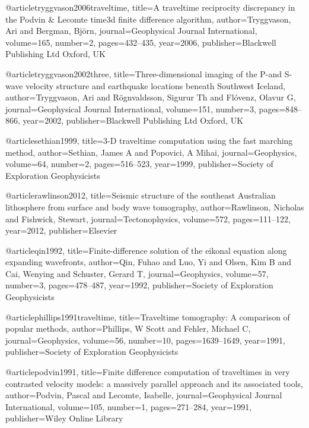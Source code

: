 @article{tryggvason2006traveltime,
  title={A traveltime reciprocity discrepancy in the Podvin \& Lecomte time3d finite difference algorithm},
  author={Tryggvason, Ari and Bergman, Bj{\"o}rn},
  journal={Geophysical Journal International},
  volume={165},
  number={2},
  pages={432--435},
  year={2006},
  publisher={Blackwell Publishing Ltd Oxford, UK}
}

@article{tryggvason2002three,
  title={Three-dimensional imaging of the P-and S-wave velocity structure and earthquake locations beneath Southwest Iceland},
  author={Tryggvason, Ari and R{\"o}gnvaldsson, Sigur{\dh}ur Th and Fl{\'o}venz, Olavur G},
  journal={Geophysical Journal International},
  volume={151},
  number={3},
  pages={848--866},
  year={2002},
  publisher={Blackwell Publishing Ltd Oxford, UK}
}

@article{sethian1999,
  title={3-D traveltime computation using the fast marching method},
  author={Sethian, James A and Popovici, A Mihai},
  journal={Geophysics},
  volume={64},
  number={2},
  pages={516--523},
  year={1999},
  publisher={Society of Exploration Geophysicists}
}

@article{rawlinson2012,
  title={Seismic structure of the southeast Australian lithosphere from surface and body wave tomography},
  author={Rawlinson, Nicholas and Fishwick, Stewart},
  journal={Tectonophysics},
  volume={572},
  pages={111--122},
  year={2012},
  publisher={Elsevier}
}

@article{qin1992,
  title={Finite-difference solution of the eikonal equation along expanding wavefronts},
  author={Qin, Fuhao and Luo, Yi and Olsen, Kim B and Cai, Wenying and Schuster, Gerard T},
  journal={Geophysics},
  volume={57},
  number={3},
  pages={478--487},
  year={1992},
  publisher={Society of Exploration Geophysicists}
}

@article{phillips1991traveltime,
  title={Traveltime tomography: A comparison of popular methods},
  author={Phillips, W Scott and Fehler, Michael C},
  journal={Geophysics},
  volume={56},
  number={10},
  pages={1639--1649},
  year={1991},
  publisher={Society of Exploration Geophysicists}
}

@article{podvin1991,
  title={Finite difference computation of traveltimes in very contrasted velocity models: a massively parallel approach and its associated tools},
  author={Podvin, Pascal and Lecomte, Isabelle},
  journal={Geophysical Journal International},
  volume={105},
  number={1},
  pages={271--284},
  year={1991},
  publisher={Wiley Online Library}
}






